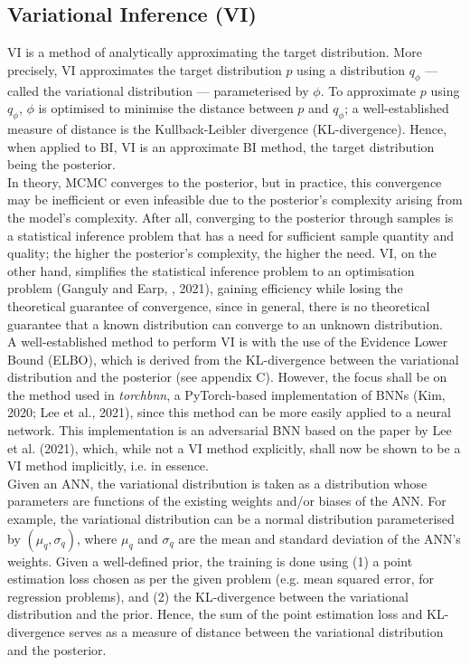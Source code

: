 \documentclass[conference]{IEEEtran}
\begin{document}
\subsection{Variational Inference (VI)}
VI is a method of analytically approximating the target distribution. More precisely, VI approximates the target distribution $p$ using a distribution $q_\phi$ — called the variational distribution — parameterised by $\phi$. To approximate $p$ using $q_{\phi}$, $\phi$ is optimised to minimise the distance between $p$ and $q_{\phi}$; a well-established measure of distance is the Kullback-Leibler divergence (KL-divergence). Hence, when applied to BI, VI is an approximate BI method, the target distribution being the posterior.\\

In theory, MCMC converges to the posterior, but in practice, this convergence may be inefficient or even infeasible due to the posterior's complexity arising from the model's complexity. After all, converging to the posterior through samples is a statistical inference problem that has a need for sufficient sample quantity and quality; the higher the posterior's complexity, the higher the need. VI, on the other hand, simplifies the statistical inference problem to an optimisation problem (Ganguly and Earp, , 2021), gaining efficiency while losing the theoretical guarantee of convergence, since in general, there is no theoretical guarantee that a known distribution can converge to an unknown distribution.\\

A well-established method to perform VI is with the use of the Evidence Lower Bound (ELBO), which is derived from the KL-divergence between the variational distribution and the posterior (see appendix C). However, the focus shall be on the method used in \textit{torchbnn}, a PyTorch-based implementation of BNNs (Kim, 2020; Lee et al., 2021), since this method can be more easily applied to a neural network. This implementation is an adversarial BNN based on the paper by Lee et al. (2021), which, while not a VI method explicitly, shall now be shown to be a VI method implicitly, i.e. in essence.\\

Given an ANN, the variational distribution is taken as a distribution whose parameters are functions of the existing weights and/or biases of the ANN. For example, the variational distribution can be a normal distribution parameterised by $(\mu_q, \sigma_q)$, where $\mu_q$ and $\sigma_q$ are the mean and standard deviation of the ANN's weights. Given a well-defined prior, the training is done using (1) a point estimation loss chosen as per the given problem (e.g. mean squared error, for regression problems), and (2) the KL-divergence between the variational distribution and the prior. Hence, the sum of the point estimation loss and KL-divergence serves as a measure of distance between the variational distribution and the posterior.
\end{document}
